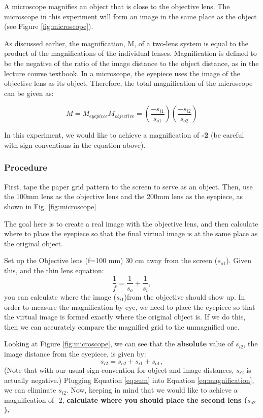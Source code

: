 A microscope magnifies an object that is close to the objective lens. The microscope
in this experiment will form an image in the same place as the object (see Figure
\ref{fig:microscope}).

As discussed earlier, the magnification, M, of a two-lens system is equal to the product of the magnifications
of the individual lenses. Magnification is defined to be the negative of the ratio of the image distance to the object distance, as in the lecture course textbook. In a microscope, the eyepiece uses the image of the objective lens as its object. Therefore, the total magnification of the microscope can be given as:

\begin{equation}
\label{eq:magnification}
	M=M_{eyepiece}M_{objective} =  \left(\frac{-s_{i1}}{s_{o1}}\right) \left(\frac{-s_{i2}}{s_{o2}}\right)
\end{equation}

In this experiment, we would like to achieve a magnification of \textbf{-2} (be careful with sign conventions in the equation above).

\subsubsection*{Procedure}
First, tape the paper grid pattern to the screen to serve as an object. Then, use the 100mm lens as the objective lens and the 200mm lens as the eyepiece, as shown in Fig. \ref{fig:microscope}

The goal here is to create a real image with the objective lens, and then calculate where to place the eyepiece so that the final virtual image is at the same place as the original object.

Set up the Objective lens (f=100 mm) 30 cm away from the screen ($s_{o1}$). Given this, and the thin lens equation:
$$
\frac{1}{f}=\frac{1}{s_{o}}+\frac{1}{s_i},
$$
you can calculate where the image ($s_{i1}$)from the objective should show up. In order to measure the magnification by eye, we need to place the eyepiece so that the virtual image is formed exactly where the original object is. If we do this, then we can accurately compare the magnified grid to the unmagnified one.

 Looking at Figure \ref{fig:microscope}, we can see that the \textbf{absolute} value of $s_{i2}$, the image distance from the eyepiece, is given by:
\begin{equation}
\label{eq:sum}
s_{i2} = s_{o2}+s_{i1}+s_{o1},
\end{equation}
(Note that with our usual sign convention for object and image distances, $s_{i2}$ is actually negative.)
Plugging Equation \ref{eq:sum} into Equation \ref{eq:magnification}, we can eliminate $s_{i2}$. Now,  keeping in mind that we would like to achieve a magnification of -2, \textbf{calculate where you should place the second lens ($s_{o2}$).}

